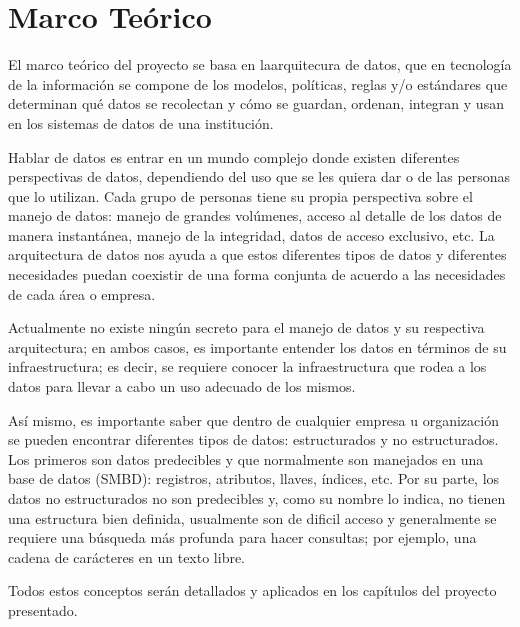 \chapter*{Marco Teórico}
\label{cap:mteorico}

El marco teórico del proyecto se basa en laarquitecura de datos, que en
tecnología de la información se compone de los modelos, políticas, reglas y/o
estándares que determinan qué datos se recolectan y cómo se guardan, ordenan,
integran y usan en los sistemas de datos de una institución.

Hablar de datos es entrar en un mundo complejo donde existen diferentes
perspectivas de datos, dependiendo del uso que se les quiera dar o de las
personas que lo utilizan. Cada grupo de personas tiene su propia perspectiva
sobre el manejo de datos: manejo de grandes volúmenes, acceso al detalle de los
datos de manera instantánea, manejo de la integridad, datos de acceso exclusivo,
etc. La arquitectura de datos nos ayuda a que estos diferentes tipos de datos y
diferentes necesidades puedan coexistir de una forma conjunta de acuerdo a las
necesidades de cada área o empresa.

Actualmente no existe ningún secreto para el manejo de datos y su respectiva
arquitectura; en ambos casos, es importante entender los datos en términos de su
infraestructura; es decir, se requiere conocer la infraestructura que rodea a
los datos para llevar a cabo un uso adecuado de los mismos.

Así mismo, es importante saber que dentro de cualquier empresa u organización se
pueden encontrar diferentes tipos de datos: estructurados y no
estructurados. Los primeros son datos predecibles y que normalmente son
manejados en una base de datos (SMBD): registros, atributos, llaves, índices,
etc. Por su parte, los datos no estructurados no son predecibles y, como su
nombre lo indica, no tienen una estructura bien definida, usualmente son de
dificil acceso y generalmente se requiere una búsqueda más profunda para hacer
consultas; por ejemplo, una cadena de carácteres en un texto libre.

Todos estos conceptos serán detallados y aplicados en los capítulos del proyecto
presentado.

\cleardoublepage

